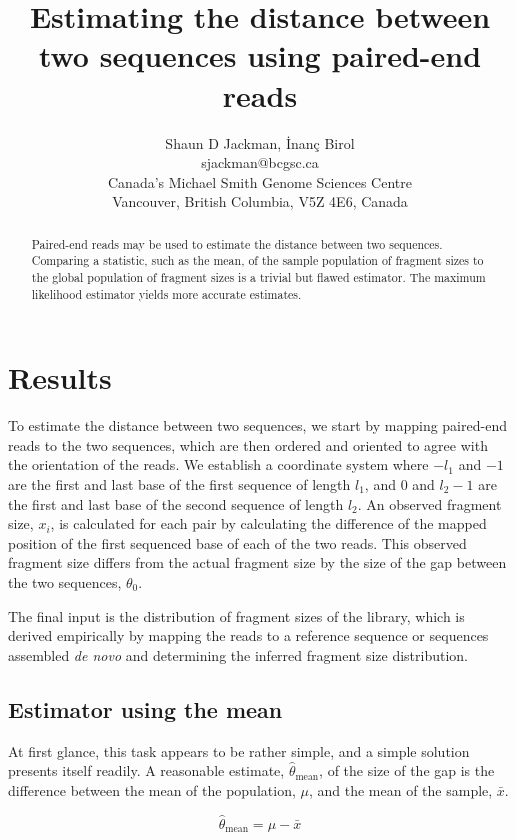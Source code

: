 \documentclass[letterpaper,12pt]{article}
\title{Estimating the distance between two sequences using paired-end reads}
\author{Shaun D Jackman, İnanç Birol \\ sjackman@bcgsc.ca \\
Canada's Michael Smith Genome Sciences Centre \\
Vancouver, British Columbia, V5Z 4E6, Canada
}
\begin{document}
\maketitle

\begin{abstract}
Paired-end reads may be used to estimate the distance between two
sequences. Comparing a statistic, such as the mean, of the sample
population of fragment sizes to the global population of fragment
sizes is a trivial but flawed estimator. The maximum likelihood
estimator yields more accurate estimates.
\end{abstract}

\section*{Results}

To estimate the distance between two sequences, we start by mapping
paired-end reads to the two sequences, which are then ordered and
oriented to agree with the orientation of the reads. We establish a
coordinate system where $-l_1$ and $-1$ are the first and last base of
the first sequence of length $l_1$, and $0$ and $l_2-1$ are the first
and last base of the second sequence of length $l_2$.  An observed
fragment size, $x_i$, is calculated for each pair by calculating the
difference of the mapped position of the first sequenced base of each
of the two reads. This observed fragment size differs from the actual
fragment size by the size of the gap between the two sequences,
$\theta_0$.

The final input is the distribution of fragment sizes of the library,
which is derived empirically by mapping the reads to a reference
sequence or sequences assembled \textit{de novo} and determining the
inferred fragment size distribution.

\subsection*{Estimator using the mean}
At first glance, this task appears to be rather simple, and a simple
solution presents itself readily. A reasonable estimate, $\hat
\theta_\text{mean}$, of the size of the gap is the difference between
the mean of the population, $\mu$, and the mean of the sample,
$\bar x$.

\begin{equation*}
\hat \theta_\text{mean} = \mu - \bar x
\end{equation*}
\end{document}
